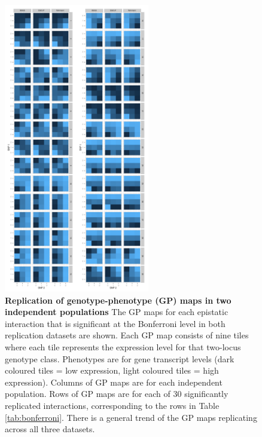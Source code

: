 \documentclass{article}
\begin{document}
\begin{figure}[H]
	\centering
	\includegraphics[width=2.5in]{gpbonfrep.pdf}
	\caption{\textbf{Replication of genotype-phenotype (GP) maps in two independent populations} The GP maps for each epistatic interaction that is significant at the Bonferroni level in both replication datasets are shown. Each GP map consists of nine tiles where each tile represents the expression level for that two-locus genotype class. Phenotypes are for gene transcript levels (dark coloured tiles = low expression, light coloured tiles = high expression). Columns of GP maps are for each independent population. Rows of GP maps are for each of 30 significantly replicated interactions, corresponding to the rows in Table \ref{tab:bonferroni}. There is a general trend of the GP maps replicating across all three datasets.}
	\label{fig:gpmaps}
\end{figure}
\clearpage
\end{document}
